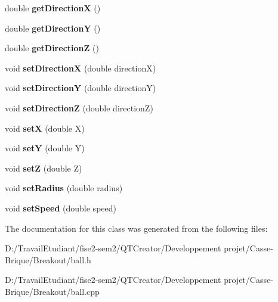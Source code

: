\begin{DoxyCompactItemize}
\mbox{\label{class_ball_a3b36da76a1ea6c1e30ffa4ed60ccd446}} 
double {\bfseries get\+DirectionX} ()
\item 
\mbox{\label{class_ball_a791c67c6112d626112b09e43420089a6}} 
double {\bfseries get\+DirectionY} ()
\item 
\mbox{\label{class_ball_a7d6e946cfe6310088e938258cb9e88f1}} 
double {\bfseries get\+DirectionZ} ()
\item 
\mbox{\label{class_ball_a51f2f0f1e6aa3b1cee878c1713f31fbb}} 
void {\bfseries set\+DirectionX} (double directionX)
\item 
\mbox{\label{class_ball_a7758c0e5b90900b8984e602797798d12}} 
void {\bfseries set\+DirectionY} (double directionY)
\item 
\mbox{\label{class_ball_a1f44da15c5d258b37d7e349f04e78890}} 
void {\bfseries set\+DirectionZ} (double directionZ)
\item 
\mbox{\label{class_ball_a67a08cf9315f3f2c38408f0f24ffd389}} 
void {\bfseries setX} (double X)
\item 
\mbox{\label{class_ball_a074c539ee788dda3edcd3dbafe46c6b1}} 
void {\bfseries setY} (double Y)
\item 
\mbox{\label{class_ball_ae58e925566371743c7fe20af87d007f9}} 
void {\bfseries setZ} (double Z)
\item 
\mbox{\label{class_ball_a991945691ac284db8cdd5b216f7f8223}} 
void {\bfseries set\+Radius} (double radius)
\item 
\mbox{\label{class_ball_acf8c22e5244ca7ab3d1d7af9aa6f3f18}} 
void {\bfseries set\+Speed} (double speed)
\end{DoxyCompactItemize}


The documentation for this class was generated from the following files\+:\begin{DoxyCompactItemize}
\item 
D\+:/\+Travail\+Etudiant/fise2-\/sem2/\+Q\+T\+Creator/\+Developpement projet/\+Casse-\/\+Brique/\+Breakout/ball.\+h\item 
D\+:/\+Travail\+Etudiant/fise2-\/sem2/\+Q\+T\+Creator/\+Developpement projet/\+Casse-\/\+Brique/\+Breakout/ball.\+cpp\end{DoxyCompactItemize}

